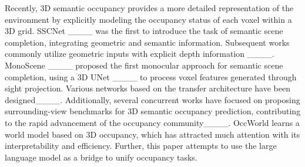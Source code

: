 Recently, 3D semantic occupancy provides a more detailed representation of the environment by explicitly modeling the occupancy status of each voxel within a 3D grid. SSCNet ____ was the first to introduce the task of semantic scene completion, integrating geometric and semantic information. Subsequent works commonly utilize geometric inputs with explicit depth information ____. MonoScene ____ proposed the first monocular approach for semantic scene completion, using a 3D UNet ____ to process voxel features generated through sight projection. Various networks based on the transfer architecture have been designed____. Additionally, several concurrent works have focused on proposing surrounding-view benchmarks for 3D semantic occupancy prediction, contributing to the rapid advancement of the occupancy community____. OccWorld learns a world model based on 3D occupancy, which has attracted much attention with its interpretability and efficiency. Further, this paper attempts to use the large language model as a bridge to unify occupancy tasks.



